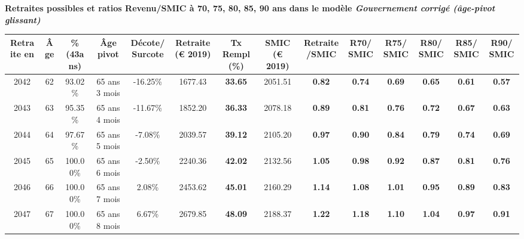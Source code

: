  \vspace{0.1cm} 
{\bf \noindent Retraites possibles et ratios Revenu/SMIC à 70, 75, 80, 85, 90 ans dans le modèle \emph{Gouvernement corrigé (âge-pivot glissant)}}  
 
\begin{adjustbox}{max width=\textwidth} 
\begin{tabular}[htb]{|c|c||c|c|c||c|c||c|c||c|c|c|c|c|} 
\hline 
 Retraite en &  Âge &  \%(43ans) &  Âge pivot &  Décote/Surcote &  Retraite (\euro{} 2019) &  Tx Rempl(\%) &  SMIC (\euro{} 2019) &  Retraite/SMIC &  R70/SMIC &  R75/SMIC &  R80/SMIC &  R85/SMIC &  R90/SMIC \\ 
\hline \hline 
 2042 &  62 &  93.02\% &  65 ans 3 mois &  -16.25\% &  1677.43 &  {\bf 33.65} &  2051.51 &  {\bf {\color{red} 0.82}} &  {\bf {\color{red} 0.74}} &  {\bf {\color{red} 0.69}} &  {\bf {\color{red} 0.65}} &  {\bf {\color{red} 0.61}} &  {\bf {\color{red} 0.57}} \\ 
\hline 
 2043 &  63 &  95.35\% &  65 ans 4 mois &  -11.67\% &  1852.20 &  {\bf 36.33} &  2078.18 &  {\bf {\color{red} 0.89}} &  {\bf {\color{red} 0.81}} &  {\bf {\color{red} 0.76}} &  {\bf {\color{red} 0.72}} &  {\bf {\color{red} 0.67}} &  {\bf {\color{red} 0.63}} \\ 
\hline 
 2044 &  64 &  97.67\% &  65 ans 5 mois &  -7.08\% &  2039.57 &  {\bf 39.12} &  2105.20 &  {\bf {\color{red} 0.97}} &  {\bf {\color{red} 0.90}} &  {\bf {\color{red} 0.84}} &  {\bf {\color{red} 0.79}} &  {\bf {\color{red} 0.74}} &  {\bf {\color{red} 0.69}} \\ 
\hline 
 2045 &  65 &  100.00\% &  65 ans 6 mois &  -2.50\% &  2240.36 &  {\bf 42.02} &  2132.56 &  {\bf 1.05} &  {\bf {\color{red} 0.98}} &  {\bf {\color{red} 0.92}} &  {\bf {\color{red} 0.87}} &  {\bf {\color{red} 0.81}} &  {\bf {\color{red} 0.76}} \\ 
\hline 
 2046 &  66 &  100.00\% &  65 ans 7 mois &  2.08\% &  2453.62 &  {\bf 45.01} &  2160.29 &  {\bf 1.14} &  {\bf 1.08} &  {\bf 1.01} &  {\bf {\color{red} 0.95}} &  {\bf {\color{red} 0.89}} &  {\bf {\color{red} 0.83}} \\ 
\hline 
 2047 &  67 &  100.00\% &  65 ans 8 mois &  6.67\% &  2679.85 &  {\bf 48.09} &  2188.37 &  {\bf 1.22} &  {\bf 1.18} &  {\bf 1.10} &  {\bf 1.04} &  {\bf {\color{red} 0.97}} &  {\bf {\color{red} 0.91}} \\ 
\hline 
\hline 
\end{tabular} 
\end{adjustbox} 
 
